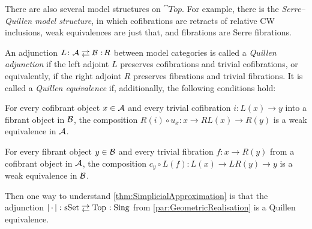 \begin{exm}
	There are also several model structures on $\cat{Top}$. For example, there is the \emph{Serre--Quillen model structure}, in which cofibrations are retracts of relative CW inclusions, weak equivalences are just that, and fibrations are Serre fibrations.
	
	An adjunction $L\colon \Aa\shortdoublelrmorphism \Bb\noloc R$ between model categories is called a \emph{Quillen adjunction} if the left adjoint $L$ preserves cofibrations and trivial cofibrations, or equivalently, if the right adjoint $R$ preserves fibrations and trivial fibrations. It is called a \emph{Quillen equivalence} if, additionally, the following conditions hold:
	\begin{alphanumerate}
		\item For every cofibrant object $x\in\mathcal{A}$ and every trivial cofibration $i\colon L(x)\rightarrow y$ into a fibrant object in $\mathcal{B}$, the composition $R(i)\circ u_x\colon x\rightarrow RL(x)\rightarrow R(y)$ is a weak equivalence in $\mathcal{A}$.
		\item For every fibrant object $y\in\mathcal{B}$ and every trivial fibration $f\colon x\rightarrow R(y)$ from a cofibrant object in $\mathcal{A}$, the composition $c_y\circ L(f)\colon L(x)\rightarrow LR(y)\rightarrow y$ is a weak equivalence in $\mathcal{B}$.
	\end{alphanumerate}
	Then one way to understand \cref{thm:SimplicialApproximation} is that the adjunction $\left|\,\cdot\,\right|\colon\cat{sSet}\shortdoublelrmorphism \cat{Top}\noloc \Sing$ from \cref{par:GeometricRealisation} is a Quillen equivalence.
\end{exm}

\newpage
